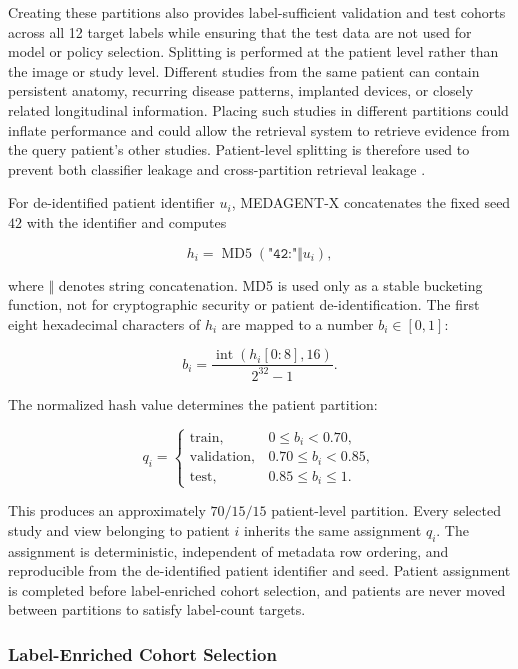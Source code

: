 Creating these partitions also provides label-sufficient validation and test cohorts across all 12 target labels while ensuring that the test data are not used for model or policy selection. Splitting is performed at the patient level rather than the image or study level. Different studies from the same patient can contain persistent anatomy, recurring disease patterns, implanted devices, or closely related longitudinal information. Placing such studies in different partitions could inflate performance and could allow the retrieval system to retrieve evidence from the query patient's other studies. Patient-level splitting is therefore used to prevent both classifier leakage and cross-partition retrieval leakage \cite{holste2022longtailed}.

For de-identified patient identifier $u_i$, MEDAGENT-X concatenates the fixed seed $42$ with the identifier and computes

\[
h_i
=
\operatorname{MD5}\!\left(\texttt{"42:"}\Vert u_i\right),
\]

where $\Vert$ denotes string concatenation. MD5 is used only as a stable bucketing function, not for cryptographic security or patient de-identification. The first eight hexadecimal characters of $h_i$ are mapped to a number $b_i\in[0,1]$:

\[
b_i
=
\frac{\operatorname{int}(h_i[0{:}8],16)}{2^{32}-1}.
\]

The normalized hash value determines the patient partition:

\[
q_i=
\begin{cases}
\mathrm{train}, & 0\le b_i<0.70,\\
\mathrm{validation}, & 0.70\le b_i<0.85,\\
\mathrm{test}, & 0.85\le b_i\le1.
\end{cases}
\]

This produces an approximately $70/15/15$ patient-level partition. Every selected study and view belonging to patient $i$ inherits the same assignment $q_i$. The assignment is deterministic, independent of metadata row ordering, and reproducible from the de-identified patient identifier and seed. Patient assignment is completed before label-enriched cohort selection, and patients are never moved between partitions to satisfy label-count targets.

\subsubsection{Label-Enriched Cohort Selection}

